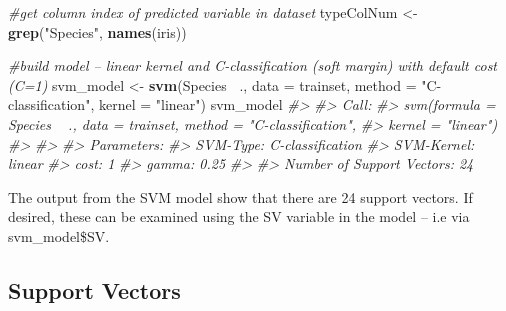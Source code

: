 \documentclass[]{book}
\newenvironment{Shaded}{\begin{snugshade}}{\end{snugshade}}
\newcommand{\CommentTok}[1]{\textcolor[rgb]{0.56,0.35,0.01}{\textit{#1}}}
\newcommand{\DataTypeTok}[1]{\textcolor[rgb]{0.13,0.29,0.53}{#1}}
\newcommand{\KeywordTok}[1]{\textcolor[rgb]{0.13,0.29,0.53}{\textbf{#1}}}
\newcommand{\NormalTok}[1]{#1}
\newcommand{\OperatorTok}[1]{\textcolor[rgb]{0.81,0.36,0.00}{\textbf{#1}}}
\newcommand{\StringTok}[1]{\textcolor[rgb]{0.31,0.60,0.02}{#1}}
\begin{document}
\begin{Shaded}
\begin{Highlighting}[]
\CommentTok{#get column index of predicted variable in dataset}
\NormalTok{typeColNum <-}\StringTok{ }\KeywordTok{grep}\NormalTok{(}\StringTok{"Species"}\NormalTok{, }\KeywordTok{names}\NormalTok{(iris))}

\CommentTok{#build model – linear kernel and C-classification (soft margin) with default cost (C=1)}
\NormalTok{svm_model <-}\StringTok{ }\KeywordTok{svm}\NormalTok{(Species}\OperatorTok{~}\StringTok{ }\NormalTok{., }\DataTypeTok{data =}\NormalTok{ trainset, }
                 \DataTypeTok{method =} \StringTok{"C-classification"}\NormalTok{, }
                 \DataTypeTok{kernel =} \StringTok{"linear"}\NormalTok{)}
\NormalTok{svm_model}
\CommentTok{#> }
\CommentTok{#> Call:}
\CommentTok{#> svm(formula = Species ~ ., data = trainset, method = "C-classification", }
\CommentTok{#>     kernel = "linear")}
\CommentTok{#> }
\CommentTok{#> }
\CommentTok{#> Parameters:}
\CommentTok{#>    SVM-Type:  C-classification }
\CommentTok{#>  SVM-Kernel:  linear }
\CommentTok{#>        cost:  1 }
\CommentTok{#>       gamma:  0.25 }
\CommentTok{#> }
\CommentTok{#> Number of Support Vectors:  24}
\end{Highlighting}
\end{Shaded}

The output from the SVM model show that there are 24 support vectors. If desired, these can be examined using the SV variable in the model -- i.e via svm\_model\$SV.

\hypertarget{support-vectors-1}{%
\subsection{Support Vectors}\label{support-vectors-1}}
\end{document}
